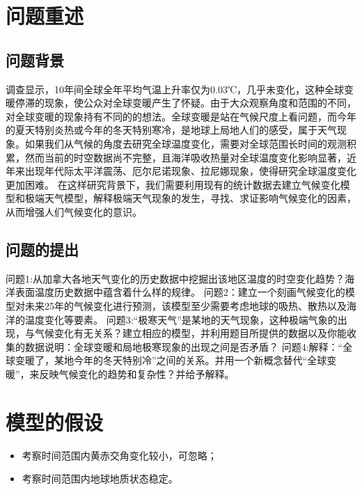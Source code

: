 \documentclass[bwprint]{gmcmthesis}
\begin{document}
\pagestyle{plain}


\section{问题重述}

\subsection{问题背景}

调查显示，10年间全球全年平均气温上升率仅为0.03℃，几乎未变化，这种全球变暖停滞的现象，使公众对全球变暖产生了怀疑。由于大众观察角度和范围的不同，对全球变暖的现象持有不同的的想法。全球变暖是站在气候尺度上看问题，而今年的夏天特别炎热或今年的冬天特别寒冷，是地球上局地人们的感受，属于天气现象。如果我们从气候的角度去研究全球温度变化，需要对全球范围长时间的观测积累，然而当前的时空数据尚不完整，且海洋吸收热量对全球温度变化影响显著，近年来出现年代际太平洋震荡、厄尔尼诺现象、拉尼娜现象，使得研究全球温度变化更加困难。
在这样研究背景下，我们需要利用现有的统计数据去建立气候变化模型和极端天气模型，解释极端天气现象的发生，寻找、求证影响气候变化的因素，从而增强人们气候变化的意识。

\subsection{问题的提出}

问题1:从加拿大各地天气变化的历史数据中挖掘出该地区温度的时空变化趋势？海洋表面温度历史数据中蕴含着什么样的规律。
问题2：建立一个刻画气候变化的模型对未来25年的气候变化进行预测，该模型至少需要考虑地球的吸热、散热以及海洋的温度变化等要素。
问题3:“极寒天气”是某地的天气现象，这种极端气象的出现，与气候变化有无关系？建立相应的模型，并利用题目所提供的数据以及你能收集的数据说明：全球变暖和局地极寒现象的出现之间是否矛盾？
问题4:解释：“全球变暖了，某地今年的冬天特别冷”之间的关系。并用一个新概念替代“全球变暖”，来反映气候变化的趋势和复杂性？并给予解释。

\section{模型的假设}

\begin{itemize}
\item 考察时间范围内黄赤交角变化较小，可忽略；
\item 考察时间范围内地球地质状态稳定。
\end{itemize}
\end{document}
